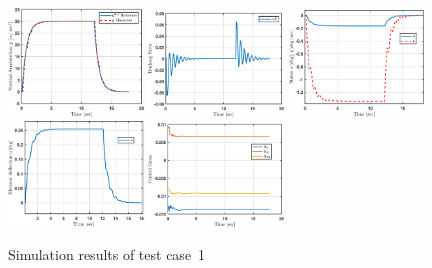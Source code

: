 \begin{figure}[htb]
  \centering
  {%
    \includegraphics[width=0.32\textwidth]{figures/Matlab/Fig1_1}%
  }
  \hfill
  {%
    \includegraphics[width=0.32\textwidth]{figures/Matlab/Fig1_5}%
  }
  \hfill
  {%
    \includegraphics[width=0.32\textwidth]{figures/Matlab/Fig1_2}%
  }
  \\[2ex]
  \mbox{}\hfill
  {%
    \includegraphics[width=0.32\textwidth]{figures/Matlab/Fig1_3}%
  }
  \hfill
  {%
    \includegraphics[width=0.32\textwidth]{figures/Matlab/Fig1_4}%
  }
  \hfill\mbox{}
  \caption{Simulation results of test case~1\label{fig:experiment1}} 
\end{figure}





